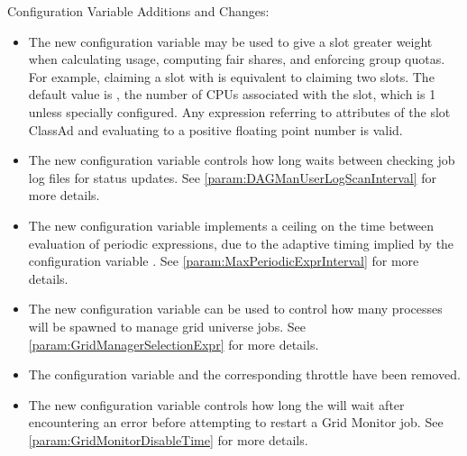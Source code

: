 \noindent Configuration Variable Additions and Changes:

\begin{itemize}

\item The new configuration variable  may be used to
give a slot greater weight when calculating usage, computing fair
shares, and enforcing group quotas.  For example, claiming a slot with
 is equivalent to claiming two  slots.  The default value is , the number of CPUs
associated with the slot, which is 1 unless specially configured.  Any
expression referring to attributes of the slot ClassAd and evaluating
to a positive floating point number is valid.


\item The new configuration variable 
controls how long  waits between checking job log files
for status updates.
See \ref{param:DAGManUserLogScanInterval} for more details.

\item The new configuration variable 
  implements a ceiling on the time between evaluation of periodic expressions,
  due to the adaptive timing implied by the configuration variable
  .
  See \ref{param:MaxPeriodicExprInterval} for more details.

\item The new configuration variable 
can be used to control how many  processes will be
spawned to manage grid universe jobs. 
See \ref{param:GridManagerSelectionExpr} for more details.

\item The configuration variable
 and the
corresponding throttle 
have been removed.

\item The new configuration variable 
controls how long the  will wait after encountering
an error before attempting to restart a Grid Monitor job.
See \ref{param:GridMonitorDisableTime} for more details.

\end{itemize}

